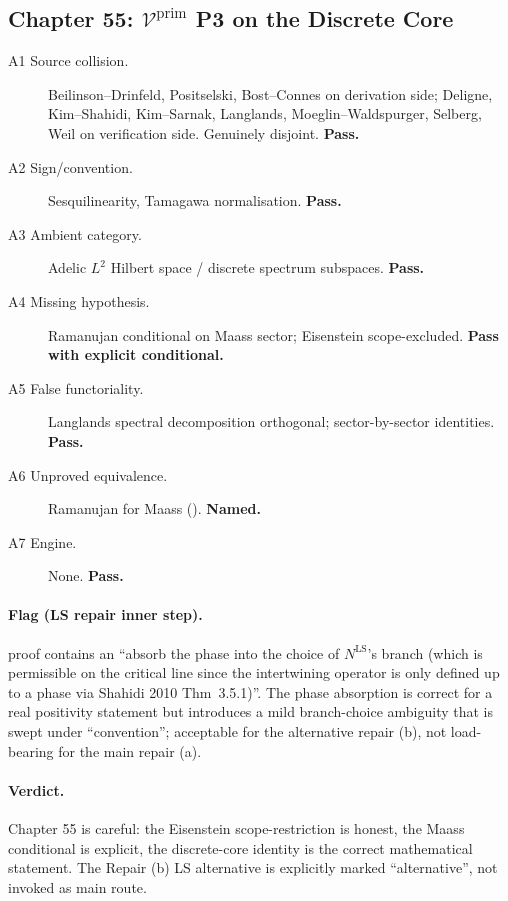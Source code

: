 \subsection{Chapter 55: \(\mathcal{V}^{\mathrm{prim}}\) P3 on the Discrete Core}
\label{v4-arith:w6-j:ch55}

\begin{description}
\item[A1 Source collision.] Beilinson--Drinfeld, Positselski,
Bost--Connes on derivation side; Deligne, Kim--Shahidi, Kim--Sarnak,
Langlands, Moeglin--Waldspurger, Selberg, Weil on verification side.
Genuinely disjoint. \textbf{Pass.}
\item[A2 Sign/convention.] Sesquilinearity, Tamagawa normalisation.
\textbf{Pass.}
\item[A3 Ambient category.] Adelic \(L^{2}\) Hilbert space / discrete
spectrum subspaces. \textbf{Pass.}
\item[A4 Missing hypothesis.] Ramanujan conditional on Maass
sector; Eisenstein scope-excluded. \textbf{Pass with explicit
conditional.}
\item[A5 False functoriality.] Langlands spectral decomposition
orthogonal; sector-by-sector identities. \textbf{Pass.}
\item[A6 Unproved equivalence.] Ramanujan for Maass
(). \textbf{Named.}
\item[A7 Engine.] None. \textbf{Pass.}
\end{description}

\paragraph{Flag (LS repair inner step).}
 proof contains an
``absorb the phase into the choice of \(N^{\mathrm{LS}}\)'s branch
(which is permissible on the critical line since the intertwining
operator is only defined up to a phase via Shahidi 2010 Thm~3.5.1)''.
The phase absorption is correct for a real positivity statement but
introduces a mild branch-choice ambiguity that is swept under
``convention''; acceptable for the alternative repair (b), not
load-bearing for the main repair (a).

\paragraph{Verdict.} Chapter 55 is careful: the Eisenstein
scope-restriction is honest, the Maass conditional is explicit, the
discrete-core identity is the correct mathematical statement. The
Repair (b) LS alternative is explicitly marked ``alternative'', not
invoked as main route.

